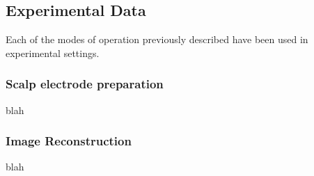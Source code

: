 \subsection{Experimental Data}


Each of the modes of operation previously described have been used in experimental settings. 

\subsubsection{Scalp electrode preparation}
blah
\subsubsection{Image Reconstruction}
blah











